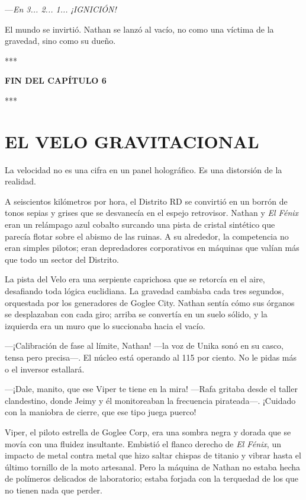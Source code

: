 \documentclass[11pt,twoside]{book}
\begin{document}
---\textit{En 3... 2... 1... ¡IGNICIÓN!}

El mundo se invirtió. Nathan se lanzó al vacío, no como una víctima de la gravedad, sino como su dueño.

\bigskip
\begin{center}***\end{center}
\bigskip

\textbf{FIN DEL CAPÍTULO 6}


\bigskip
\begin{center}***\end{center}
\bigskip

\chapter{EL VELO GRAVITACIONAL}

La velocidad no es una cifra en un panel holográfico. Es una distorsión de la realidad.

A seiscientos kilómetros por hora, el Distrito RD se convirtió en un borrón de tonos sepias y grises que se desvanecía en el espejo retrovisor. Nathan y \textit{El Fénix} eran un relámpago azul cobalto surcando una pista de cristal sintético que parecía flotar sobre el abismo de las ruinas. A su alrededor, la competencia no eran simples pilotos; eran depredadores corporativos en máquinas que valían más que todo un sector del Distrito.

La pista del Velo era una serpiente caprichosa que se retorcía en el aire, desafiando toda lógica euclidiana. La gravedad cambiaba cada tres segundos, orquestada por los generadores de Goglee City. Nathan sentía cómo sus órganos se desplazaban con cada giro; arriba se convertía en un suelo sólido, y la izquierda era un muro que lo succionaba hacia el vacío.

---¡Calibración de fase al límite, Nathan! ---la voz de Unika sonó en su casco, tensa pero precisa---. El núcleo está operando al 115 por ciento. No le pidas más o el inversor estallará.

---¡Dale, manito, que ese Viper te tiene en la mira! ---Rafa gritaba desde el taller clandestino, donde Jeimy y él monitoreaban la frecuencia pirateada---. ¡Cuidado con la maniobra de cierre, que ese tipo juega puerco!

Viper, el piloto estrella de Goglee Corp, era una sombra negra y dorada que se movía con una fluidez insultante. Embistió el flanco derecho de \textit{El Fénix}, un impacto de metal contra metal que hizo saltar chispas de titanio y vibrar hasta el último tornillo de la moto artesanal. Pero la máquina de Nathan no estaba hecha de polímeros delicados de laboratorio; estaba forjada con la terquedad de los que no tienen nada que perder.
\end{document}
